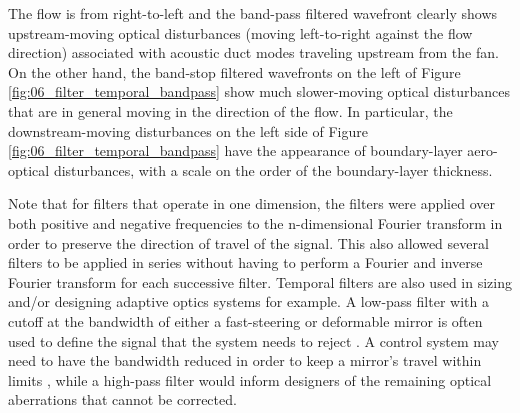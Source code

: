 The flow is from right-to-left and the band-pass filtered wavefront clearly shows upstream-moving optical disturbances (moving left-to-right against the flow direction) associated with acoustic duct modes traveling upstream from the fan.
On the other hand, the band-stop filtered wavefronts on the left of Figure \ref{fig:06_filter_temporal_bandpass} show much slower-moving optical disturbances that are in general moving in the direction of the flow.
In particular, the downstream-moving disturbances on the left side of Figure \ref{fig:06_filter_temporal_bandpass} have the appearance of boundary-layer aero-optical disturbances, with a scale on the order of the boundary-layer thickness.

Note that for filters that operate in one dimension, the filters were applied over both positive and negative frequencies to the n-dimensional Fourier transform in order to preserve the direction of travel of the signal.
This also allowed several filters to be applied in series without having to perform a Fourier and inverse Fourier transform for each successive filter.
Temporal filters are also used in sizing and/or designing adaptive optics systems \cite{Greenwood-1977-aWDqUh6C} for example.
A low-pass filter with a cutoff at the bandwidth of either a fast-steering or deformable mirror is often used to define the signal that the system needs to reject \cite{Whiteley-2007-bHbWRWUu}.
A control system may need to have the bandwidth reduced in order to keep a mirror’s travel within limits \cite{Madec-2012-YJ8eWhPB}, while a high-pass filter would inform designers of the remaining optical aberrations that cannot be corrected.

